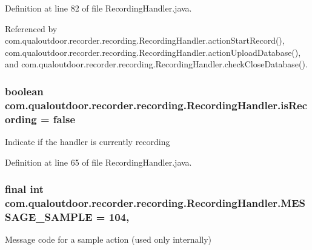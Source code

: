 Definition at line 82 of file Recording\-Handler.\-java.



Referenced by com.\-qualoutdoor.\-recorder.\-recording.\-Recording\-Handler.\-action\-Start\-Record(), com.\-qualoutdoor.\-recorder.\-recording.\-Recording\-Handler.\-action\-Upload\-Database(), and com.\-qualoutdoor.\-recorder.\-recording.\-Recording\-Handler.\-check\-Close\-Database().

\hypertarget{classcom_1_1qualoutdoor_1_1recorder_1_1recording_1_1RecordingHandler_a9dce0427fbb06ac60b6431a3c57f73ca}{
\subsubsection[{is\-Recording}]{\setlength{\rightskip}{0pt plus 5cm}boolean com.\-qualoutdoor.\-recorder.\-recording.\-Recording\-Handler.\-is\-Recording = false\hspace{0.3cm}{\ttfamily [private]}}}\label{classcom_1_1qualoutdoor_1_1recorder_1_1recording_1_1RecordingHandler_a9dce0427fbb06ac60b6431a3c57f73ca}
Indicate if the handler is currently recording 

Definition at line 65 of file Recording\-Handler.\-java.

\hypertarget{classcom_1_1qualoutdoor_1_1recorder_1_1recording_1_1RecordingHandler_a11cfd8967387855a54214ec0eaeeb372}{
\subsubsection[{M\-E\-S\-S\-A\-G\-E\-\_\-\-S\-A\-M\-P\-L\-E}]{\setlength{\rightskip}{0pt plus 5cm}final int com.\-qualoutdoor.\-recorder.\-recording.\-Recording\-Handler.\-M\-E\-S\-S\-A\-G\-E\-\_\-\-S\-A\-M\-P\-L\-E = 104\hspace{0.3cm}{\ttfamily [static]}, {\ttfamily [private]}}}\label{classcom_1_1qualoutdoor_1_1recorder_1_1recording_1_1RecordingHandler_a11cfd8967387855a54214ec0eaeeb372}
Message code for a sample action (used only internally) 

